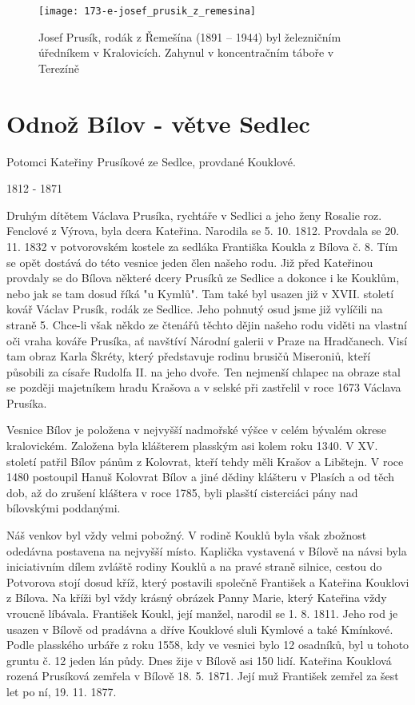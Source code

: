 \documentclass[../dejiny-rodu-prusiku.tex]{subfiles}
\begin{document}
 \begin{figure}
\centering
\texttt{[image: 173-e-josef\_prusik\_z\_remesina]}
\caption{Josef Prusík, rodák z Řemešína (1891 – 1944) byl železničním úředníkem v Kralovicích. Zahynul v koncentračním táboře v Terezíně}
\label{fig:173-e-josef_prusik_z_remesina}
\end{figure}

\section{Odnož Bílov - větve Sedlec}

Potomci Kateřiny Prusíkové ze Sedlce, provdané Kouklové.

1812 - 1871

Druhým dítětem Václava Prusíka, rychtáře v Sedlici a jeho ženy Rosalie roz. Fenclové z Výrova, byla dcera Kateřina. Narodila se 5. 10. 1812. Provdala se 20. 11. 1832 v potvorovském kostele za sedláka Františka Koukla z Bílova č. 8. Tím se opět dostává do této vesnice jeden člen našeho rodu. Již před Kateřinou provdaly se do Bílova některé dcery Prusíků ze Sedlice a dokonce i ke Kouklům, nebo jak se tam dosud říká "u Kymlů". Tam také byl usazen již v XVII. století kovář Václav Prusík, rodák ze Sedlice. Jeho pohnutý osud jsme již vylíčili na straně 5. Chce-li však někdo ze čtenářů těchto dějin našeho rodu viděti na vlastní oči vraha kováře Prusíka, ať navštíví Národní galerii v Praze na Hradčanech. Visí tam obraz Karla Škréty, který představuje rodinu brusičů Miseroniů, kteří působili za císaře Rudolfa II. na jeho dvoře. Ten nejmenší chlapec na obraze stal se později majetníkem hradu Krašova a v selské při zastřelil v roce 1673 Václava Prusíka.

Vesnice Bílov je položena v nejvyšší nadmořské výšce v celém bývalém okrese kralovickém. Založena byla klášterem plasským asi kolem roku 1340. V XV. století patřil Bílov pánům z Kolovrat, kteří tehdy měli Krašov a Libštejn. V roce 1480 postoupil Hanuš Kolovrat Bílov a jiné dědiny klášteru v Plasích a od těch dob, až do zrušení kláštera v roce 1785, byli plasští cisterciáci  pány nad bílovskými poddanými.

Náš venkov byl vždy velmi pobožný. V rodině Kouklů by­la však zbožnost odedávna postavena na nejvyšší místo. Kaplička vystavená v Bílově na návsi byla iniciativním dílem zvláště rodiny Kouklů a na pravé straně silnice, cestou do Potvorova stojí dosud kříž, který postavili společně František a Kateřina Kouklovi z Bílova. Na kří­ži byl vždy krásný obrázek Panny Marie, který Kateřina vždy vroucně líbávala. František Koukl, její manžel, na­rodil se 1. 8. 1811. Jeho rod je usazen v Bílově od pradávna a dříve Kouklové sluli Kymlové a také Kmínkové. Podle plasského urbáře z roku 1558, kdy ve vesnici bylo 12 osadníků, byl u tohoto gruntu č. 12 jeden lán půdy. Dnes žije v Bílově asi 150 lidí. Kateřina Kouklová rozená Prusíková zemřela v Bílově 18. 5. 1871. Její muž František zemřel za šest let po ní, 19. 11. 1877.
\end{document}
